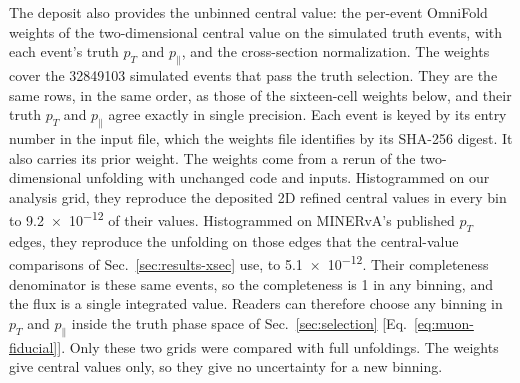 The deposit also provides the unbinned central value: the per-event OmniFold weights of the two-dimensional central value on the simulated truth events, with each event's truth $p_T$ and $p_\parallel$, and the cross-section normalization. The weights cover the \num{32849103} simulated events that pass the truth selection. They are the same rows, in the same order, as those of the sixteen-cell weights below, and their truth $p_T$ and $p_\parallel$ agree exactly in single precision. Each event is keyed by its entry number in the input file, which the weights file identifies by its SHA-256 digest. It also carries its prior weight. The weights come from a rerun of the two-dimensional unfolding with unchanged code and inputs. Histogrammed on our analysis grid, they reproduce the deposited 2D refined central values in every bin to \num{9.2e-12} of their values. Histogrammed on MINERvA's published $p_T$ edges, they reproduce the unfolding on those edges that the central-value comparisons of Sec.~\ref{sec:results-xsec} use, to \num{5.1e-12}. Their completeness denominator is these same events, so the completeness is 1 in any binning, and the flux is a single integrated value. Readers can therefore choose any binning in $p_T$ and $p_\parallel$ inside the truth phase space of Sec.~\ref{sec:selection} [Eq.~\eqref{eq:muon-fiducial}]. Only these two grids were compared with full unfoldings. The weights give central values only, so they give no uncertainty for a new binning.

